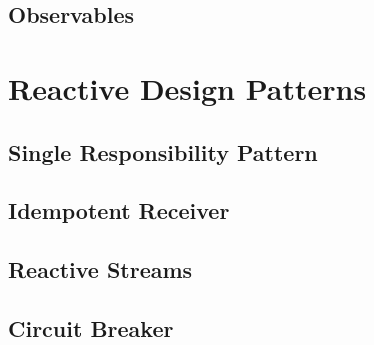 \subsection{Observables}

\pagebreak

\section{Reactive Design Patterns}
\subsection{Single Responsibility Pattern}
\subsection{Idempotent Receiver}
\subsection{Reactive Streams}
\subsection{Circuit Breaker}
